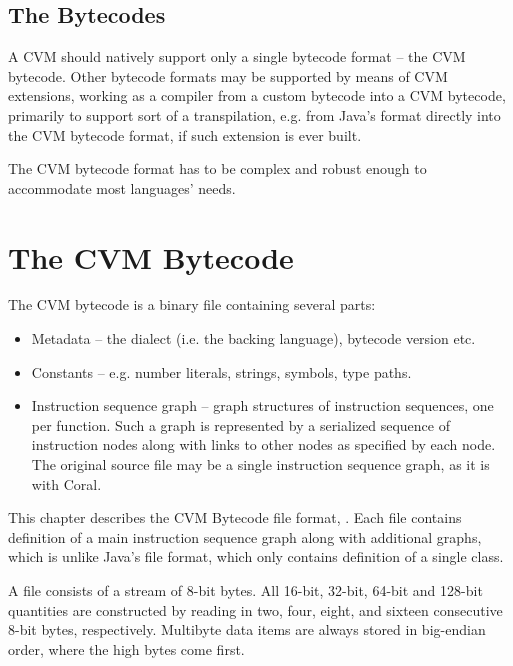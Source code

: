 \section{The Bytecodes}

A CVM should natively support only a single bytecode format -- the CVM bytecode. Other bytecode formats may be supported by means of CVM extensions, working as a compiler from a custom bytecode into a CVM bytecode, primarily to support sort of a transpilation, e.g. from Java's  format directly into the CVM bytecode format, if such extension is ever built. 

The CVM bytecode format has to be complex and robust enough to accommodate most languages' needs. 





\chapter{The CVM Bytecode}






The CVM bytecode is a binary file containing several parts:

\begin{itemize}
\item Metadata -- the dialect (i.e. the backing language), bytecode version etc.
\item Constants -- e.g. number literals, strings, symbols, type paths. 
\item Instruction sequence graph -- graph structures of instruction sequences, one per function. Such a graph is represented by a serialized sequence of instruction nodes along with links to other nodes as specified by each node. The original source file may be a single instruction sequence graph, as it is with Coral. 
\end{itemize}

This chapter describes the CVM Bytecode file format, . Each  file contains definition of a main instruction sequence graph along with additional graphs, which is unlike Java's  file format, which only contains definition of a single class. 

A  file consists of a stream of 8-bit bytes. All 16-bit, 32-bit, 64-bit and 128-bit quantities are constructed by reading in two, four, eight, and sixteen consecutive 8-bit bytes, respectively. Multibyte data items are always stored in big-endian order, where the high bytes come first. 

